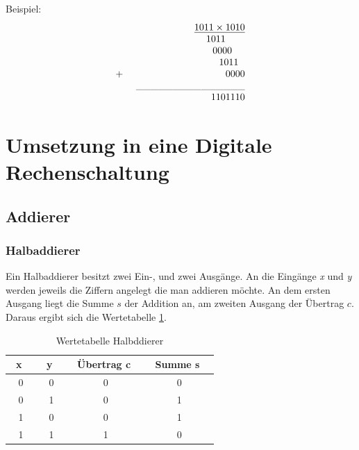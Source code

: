 \documentclass[a4paper,12pt,fleqn,oneside]{article}
\begin{document}
		Beispiel:
			\[ \begin{array}{lrcll}
   					&		 	       	\uline{1 0 1 1 \times 1 0 1 0}   	 				\\
  			       		&   			            1 0 1 1 $ $$ $$ $$ $$ $$ $        	 			\\
					&   			            0 0 0 0 $ $$ $$ $$ $        	 				\\
					&   			            1 0 1 1 $ $$ $        	 					\\
				$+ $	&   			            0 0 0 0			        	 				\\
					&	\_\_\_\_\_\_\_\_\_\_\_\_\_\_\_						\\
					&				    1101110
			\end{array} \]



\newpage

	\section{Umsetzung in eine Digitale Rechenschaltung}
	\subsection{Addierer}
		\subsubsection{Halbaddierer}
		Ein Halbaddierer besitzt zwei Ein-, und zwei Ausgänge. An die Eingänge \emph{x} und \emph{y} werden jeweils die Ziffern
		angelegt die man addieren möchte. An dem ersten Ausgang liegt die Summe $s$ der Addition an, am zweiten Ausgang der 
		Übertrag $c$.\\
		Daraus ergibt sich die Wertetabelle \ref{tab:halbaddierer}.
		\begin{table}[h]
			\center
			\begin{tabular}{c|c|c|c}
				\ \textbf{x} \ 	& \ \textbf{y} \		& \ \textbf{Übertrag c} \ & \ \textbf{Summe s} \ 	 	\\ \hline
				0 	& 0 		& 0          			& 0       			\\ \hline
				0 	& 1 		& 0          			& 1       			\\ \hline
				1 	& 0		& 0          			& 1      			 \\ \hline
				1	& 1 		& 1          			& 0      			 \\
			\end{tabular}
			\caption{Wertetabelle Halbddierer}
			\label{tab:halbaddierer}
		\end{table}
\end{document}
